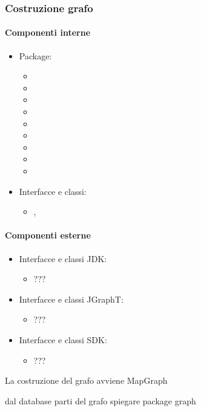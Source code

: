 \documentclass[../Funzionalita.tex]{subfiles}
\begin{document}
			
		\subsubsection{Costruzione grafo}
		
			\paragraph*{Componenti interne}
			\begin{itemize}
			
				\item Package:
				\begin{itemize}
					\item[] \model
					\item[] \dataaccess
					\item[] \service
					\item[] \dao
					\item[] \graph
					\item[] \edge
					\item[] \vertex
					\item[] \area
					\item[] \navigationinformation
				\end{itemize}
				
				\item Interfacce e classi:
				\begin{itemize}
					\item[] \MapGraph,
				\end{itemize}
			\end{itemize}
			
			\paragraph*{Componenti esterne}
			\begin{itemize}
			
				\item Interfacce e classi JDK:
				\begin{itemize}
					\item[]	???
				\end{itemize}
			
				\item Interfacce e classi JGraphT:
				\begin{itemize}
					\item[] ???
				\end{itemize}
				
				\item Interfacce e classi SDK:
				\begin{itemize}
					\item[]	???
				\end{itemize}
				
			\end{itemize}
			
			La costruzione del grafo avviene MapGraph
				
			dal database
			parti del grafo
			spiegare package graph
		
		
\end{document}
